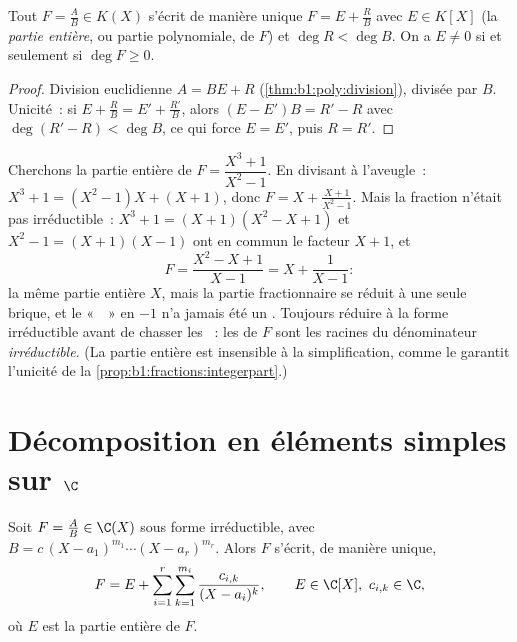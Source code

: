 \begin{proposition}\label{prop:b1:fractions:integerpart}
Tout $F = \frac AB \in K(X)$ s'écrit de manière unique $F = E + \frac
RB$ avec $E \in K[X]$ (la \emph{partie entière}, ou partie polynomiale,
de $F$) et $\deg R < \deg B$. On a $E \neq 0$ si et seulement si $\deg F
\geq 0$.
\end{proposition}

\begin{proof}
Division euclidienne $A = BE + R$ (\cref{thm:b1:poly:division}), divisée
par $B$. Unicité~: si $E + \frac RB = E' + \frac{R'}{B}$, alors $(E -
E')B = R' - R$ avec $\deg(R' - R) < \deg B$, ce qui force $E = E'$, puis
$R = R'$.
\end{proof}

\begin{example}\label{ex:b1:fractions:integerpart}
Cherchons la partie entière de $F = \dfrac{X^3 + 1}{X^2 - 1}$. En
divisant à l'aveugle~: $X^3 + 1 = (X^2 - 1)X + (X + 1)$, donc $F = X +
\frac{X + 1}{X^2 - 1}$. Mais la fraction n'était pas irréductible~: $X^3
+ 1 = (X + 1)(X^2 - X + 1)$ et $X^2 - 1 = (X+1)(X-1)$ ont en commun le
facteur $X + 1$, et
\[
F = \frac{X^2 - X + 1}{X - 1} = X + \frac{1}{X - 1} :
\]
la même partie entière $X$, mais la partie fractionnaire se réduit à une
seule brique, et le «~~» en $-1$ n'a jamais été un . Toujours
réduire à la forme irréductible avant de chasser les ~: les 
de $F$ sont les racines du dénominateur \emph{irréductible}. (La partie
entière est insensible à la simplification, comme le garantit l'unicité
de la \cref{prop:b1:fractions:integerpart}.)
\end{example}

\section{Décomposition en éléments simples sur $\C$}

\begin{theorem}\label{thm:b1:fractions:complex}
Soit $F = \frac AB \in \C(X)$ sous forme irréductible, avec $B = c\,(X -
a_1)^{m_1} \cdots (X - a_r)^{m_r}$. Alors $F$ s'écrit, de manière
unique,
\[
F = E + \sum_{i=1}^{r} \sum_{k=1}^{m_i}
\frac{c_{i,k}}{(X - a_i)^k},
\qquad E \in \C[X],\ c_{i,k} \in \C ,
\]
où $E$ est la partie entière de $F$.
\end{theorem}

